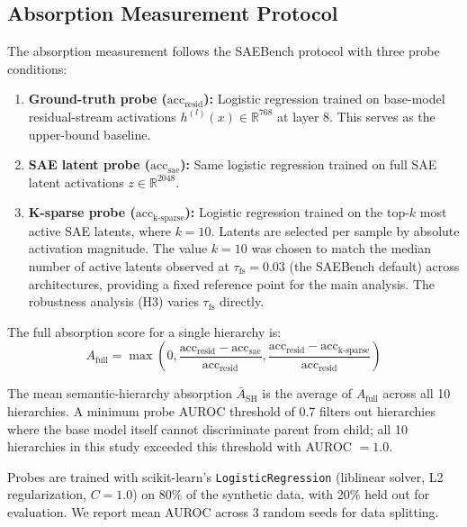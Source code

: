 \documentclass{article}
\begin{document}
\subsection{Absorption Measurement Protocol}
\label{sec:absorption_protocol}

The absorption measurement follows the SAEBench protocol with three probe conditions:

\begin{enumerate}
\item \textbf{Ground-truth probe ($\text{acc}_{\text{resid}}$):} Logistic regression trained on base-model residual-stream activations $h^{(l)}(x) \in \mathbb{R}^{768}$ at layer 8. This serves as the upper-bound baseline.

\item \textbf{SAE latent probe ($\text{acc}_{\text{sae}}$):} Same logistic regression trained on full SAE latent activations $z \in \mathbb{R}^{2048}$.

\item \textbf{K-sparse probe ($\text{acc}_{\text{k-sparse}}$):} Logistic regression trained on the top-$k$ most active SAE latents, where $k = 10$. Latents are selected per sample by absolute activation magnitude. The value $k = 10$ was chosen to match the median number of active latents observed at $\tau_{\text{fs}} = 0.03$ (the SAEBench default) across architectures, providing a fixed reference point for the main analysis. The robustness analysis (H3) varies $\tau_{\text{fs}}$ directly.
\end{enumerate}

The full absorption score for a single hierarchy is:
\begin{equation}
A_{\text{full}} = \max\left(0, \frac{\text{acc}_{\text{resid}} - \text{acc}_{\text{sae}}}{\text{acc}_{\text{resid}}}, \frac{\text{acc}_{\text{resid}} - \text{acc}_{\text{k-sparse}}}{\text{acc}_{\text{resid}}}\right)
\end{equation}

The mean semantic-hierarchy absorption $\bar{A}_{\text{SH}}$ is the average of $A_{\text{full}}$ across all 10 hierarchies. A minimum probe AUROC threshold of 0.7 filters out hierarchies where the base model itself cannot discriminate parent from child; all 10 hierarchies in this study exceeded this threshold with AUROC $= 1.0$.

Probes are trained with scikit-learn's \texttt{LogisticRegression} (liblinear solver, L2 regularization, $C = 1.0$) on 80\% of the synthetic data, with 20\% held out for evaluation. We report mean AUROC across 3 random seeds for data splitting.
\end{document}

